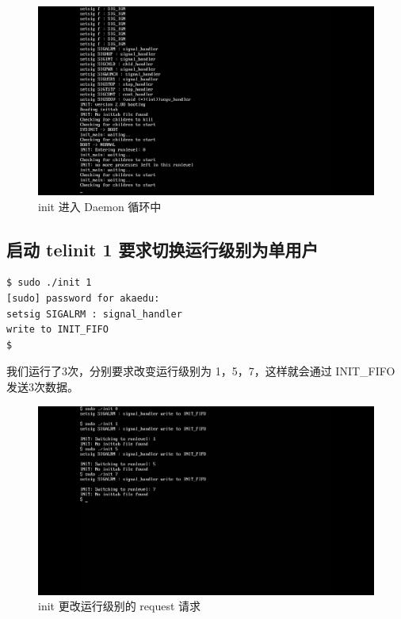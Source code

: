\begin{figure}[htbp]
\centering
\includegraphics{./pictures/init-daemon-begin.png}
\caption{init 进入 Daemon 循环中}
\end{figure}

\subsection{启动 telinit 1 要求切换运行级别为单用户}

{\begin{shaded}\begin{verbatim}
$ sudo ./init 1
[sudo] password for akaedu: 
setsig SIGALRM : signal_handler 
write to INIT_FIFO
$ 
\end{verbatim}\end{shaded}}
我们运行了3次，分别要求改变运行级别为 1，5，7，这样就会通过 INIT\_FIFO
发送3次数据。

\begin{figure}[htbp]
\centering
\includegraphics{./pictures/switch-to-runlevels.png}
\caption{init 更改运行级别的 request 请求}
\end{figure}

